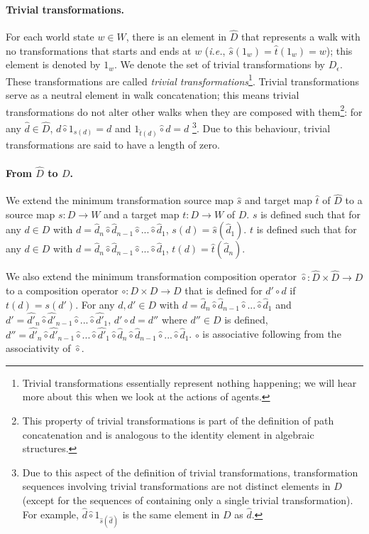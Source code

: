 \paragraph{Trivial transformations.}
For each world state $w \in W$, there is an element in $\hat{D}$ that represents a walk with no transformations that starts and ends at $w$ (\textit{i.e.}, $\hat{s}(1_{w}) = \hat{t}(1_{w}) = w$); this element is denoted by $1_{w}$.
We denote the set of trivial transformations by $D_{\epsilon}$.
These transformations are called \emph{trivial transformations}\footnote{Trivial transformations essentially represent nothing happening; we will hear more about this when we look at the actions of agents.}.
Trivial transformations serve as a neutral element in walk concatenation; this means trivial transformations do not alter other walks when they are composed with them\footnote{This property of trivial transformations is part of the definition of path concatenation and is analogous to the identity element in algebraic structures.}: for any $\hat{d} \in \hat{D}$, $d \hat{\circ} 1_{\hat{s}(d)} = d$ and $1_{\hat{t}(d)} \hat{\circ} d = d$ \footnote{Due to this aspect of the definition of trivial transformations, transformation sequences involving trivial transformations are not distinct elements in $D$ (except for the sequences of containing only a single trivial transformation).
    For example, $\hat{d} \hat{\circ} 1_{\hat{s}(\hat{d})}$ is the same element in $D$ as $\hat{d}$.}.
Due to this behaviour, trivial transformations are said to have a length of zero.

\paragraph{From $\hat{D}$ to $D$.}
We extend the minimum transformation source map $\hat{s}$ and target map $\hat{t}$ of $\hat{D}$ to a source map $s: D \to W$ and a target map $t: D \to W$ of $D$.
$s$ is defined such that for any $d \in D$ with $d = \hat{d}_{n} \hat{\circ} \hat{d}_{n-1} \hat{\circ} ... \hat{\circ} \hat{d}_{1}$, $s(d) = \hat{s}(\hat{d}_{1})$.
$t$ is defined such that for any $d \in D$ with $d = \hat{d}_{n} \hat{\circ} \hat{d}_{n-1} \hat{\circ} ... \hat{\circ} \hat{d}_{1}$, $t(d) = \hat{t}(\hat{d}_{n})$.

We also extend the minimum transformation composition operator $\hat{\circ}: \hat{D} \times \hat{D} \to D$ to a composition operator $\circ: D \times D \to D$ that is defined for $d' \circ d$ if $t(d) = s(d')$.
For any $d, d' \in D$ with $d = \hat{d}_{n} \hat{\circ} \hat{d}_{n-1} \hat{\circ} ... \hat{\circ} \hat{d}_{1}$ and $d' = \hat{d'}_{n} \hat{\circ} \hat{d'}_{n-1} \hat{\circ} ... \hat{\circ} \hat{d'}_{1}$, $d' \circ d = d''$ where $d'' \in D$ is defined, $d'' = \hat{d'}_{n} \hat{\circ} \hat{d'}_{n-1} \hat{\circ} ... \hat{\circ} \hat{d'}_{1} \hat{\circ} \hat{d}_{n} \hat{\circ} \hat{d}_{n-1} \hat{\circ} ... \hat{\circ} \hat{d}_{1}$.
$\circ$ is associative following from the associativity of $\hat{\circ}$.

